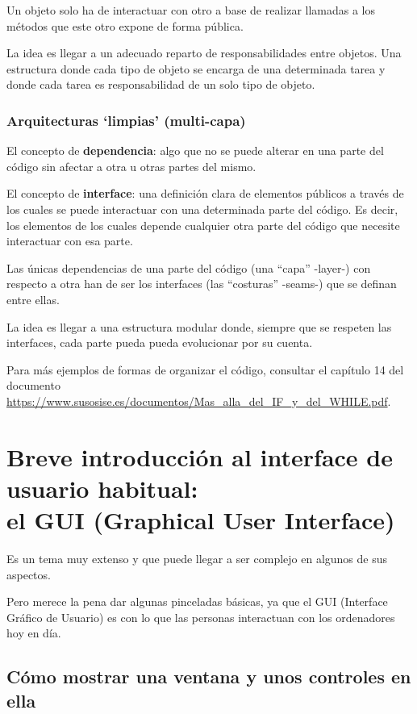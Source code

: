 \documentclass[spanish,12pt,a4paper,final,oneside]{book}
\begin{document}
Un objeto solo ha de interactuar con otro a base de realizar llamadas a los métodos que este otro expone de forma pública.

La idea es llegar a un adecuado reparto de responsabilidades entre objetos. Una estructura donde cada tipo de objeto se encarga de una determinada tarea y donde cada tarea es responsabilidad de un solo tipo de objeto.

\subsection{Arquitecturas `limpias' (multi-capa)}

El concepto de \textbf{dependencia}: algo que no se puede alterar en una parte del código sin afectar a otra u otras partes del mismo.

El concepto de \textbf{interface}: una definición clara de elementos públicos a través de los cuales se puede interactuar con una determinada parte del código. Es decir, los elementos de los cuales depende cualquier otra parte del código que necesite interactuar con esa parte.

Las únicas dependencias de una parte del código (una ``capa'' -layer-) con respecto a otra han de ser los interfaces (las ``costuras'' -seams-) que se definan entre ellas.

La idea es llegar a una estructura modular donde, siempre que se respeten las interfaces, cada parte pueda pueda evolucionar por su cuenta.
 




\vfill
Para más ejemplos de formas de organizar el código, consultar el capítulo 14 del documento \url{https://www.susosise.es/documentos/Mas_alla_del_IF_y_del_WHILE.pdf}.


\chapter{Breve introducción al interface de usuario habitual: \\el GUI (Graphical User Interface)}

Es un tema muy extenso y que puede llegar a ser complejo en algunos de sus aspectos.

Pero merece la pena dar algunas pinceladas básicas, ya que el GUI (Interface Gráfico de Usuario) es con lo que las personas interactuan con los ordenadores hoy en día.

\section{Cómo mostrar una ventana y unos controles en ella}
\end{document}
